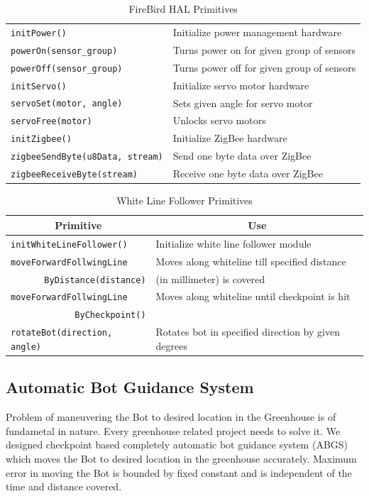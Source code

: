 \documentclass[a4paper, 12pt]{article}
\begin{document}
\begin{table}
\begin{tabular}{|l|l|}
 \hline
 \texttt{initPower()} & Initialize power management hardware\\
 \texttt{powerOn(sensor\_group)} & Turns power on for given group of sensors\\
 \texttt{powerOff(sensor\_group)} & Turns power off for given group of sensors\\
 \hline
 \texttt{initServo()} & Initialize servo motor hardware\\
 \texttt{servoSet(motor, angle)} & Sets given angle for servo motor\\
 \texttt{servoFree(motor)} &  Unlocks servo motors\\
 \hline
 \texttt{initZigbee()} & Initialize ZigBee hardware\\
 \texttt{zigbeeSendByte(u8Data, stream)} & Send one byte data over ZigBee\\
 \texttt{zigbeeReceiveByte(stream)} &  Receive one byte data over ZigBee\\
 \hline
 \end{tabular}
 \caption{FireBird HAL Primitives}
 \label{table-hal-primitives}
\end{table}

\begin{table}
 \centering
 \begin{tabular}{|l|l|}
 \hline
 \multicolumn{1}{|c|}{\textbf{Primitive}} & \multicolumn{1}{|c|}{\textbf{Use}}\\
 \hline \hline
 \texttt{initWhiteLineFollower()} & Initialize white line follower module\\
 \texttt{moveForwardFollwingLine} & Moves along whiteline till specified distance\\
 \multicolumn{1}{|r|}{\texttt{ByDistance(distance)}}& (in millimeter) is covered\\
 \texttt{moveForwardFollwingLine} & Moves along whiteline until checkpoint is hit\\
 \multicolumn{1}{|r|}{\texttt{ByCheckpoint()}} & \\
 \texttt{rotateBot(direction, angle)} & Rotates bot in specified direction by given degrees\\ 
 \hline
 \end{tabular}
 \caption{White Line Follower Primitives}
 \label{table-wlf-primitives}
\end{table}

\subsection{Automatic Bot Guidance System} \label{section-bgs}
Problem of maneuvering the Bot to desired location in the Greenhouse is of fundametal in nature. Every
greenhouse related project needs to solve it. We designed checkpoint based completely automatic bot guidance
system (ABGS) which moves the Bot to desired location in the greenhouse accurately. Maximum error in moving the Bot is
bounded by fixed constant and is independent of the time and distance covered.
\end{document}
